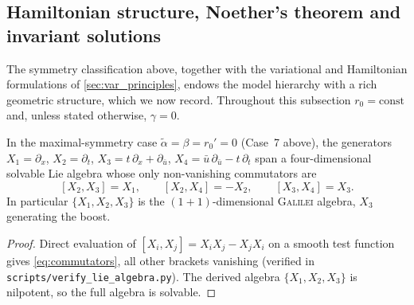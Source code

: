 \documentclass[alpha-refs, 12pt]{wiley-article}
\begin{document}
\subsection{Hamiltonian structure, Noether's theorem and invariant solutions}\label{ssec:hamiltonian}

The symmetry classification above, together with the variational and Hamiltonian formulations of \cref{sec:var_principles}, endows the model hierarchy with a rich geometric structure, which we now record. Throughout this subsection $r_{0}=\mathrm{const}$ and, unless stated otherwise, $\gamma=0$.

\begin{lemma}\label{lem:lie_algebra}
In the maximal-symmetry case $\tilde{\alpha}=\beta=r_{0}'=0$ (Case~7 above), the generators $X_{1}=\partial_{x}$, $X_{2}=\partial_{t}$, $X_{3}=t\,\partial_{x}+\partial_{\bar{u}}$, $X_{4}=\bar{u}\,\partial_{\bar{u}}-t\,\partial_{t}$ span a four-dimensional solvable Lie algebra whose only non-vanishing commutators are
\begin{equation}\label{eq:commutators}
  [X_{2},X_{3}]=X_{1},\qquad [X_{2},X_{4}]=-X_{2},\qquad [X_{3},X_{4}]=X_{3}.
\end{equation}
In particular $\{X_{1},X_{2},X_{3}\}$ is the $(1+1)$-dimensional \textsc{Galilei} algebra, $X_{3}$ generating the boost.
\end{lemma}
\begin{proof}
Direct evaluation of $[X_{i},X_{j}]=X_{i}X_{j}-X_{j}X_{i}$ on a smooth test function gives \eqref{eq:commutators}, all other brackets vanishing (verified in \texttt{scripts/verify\_lie\_algebra.py}). The derived algebra $\{X_{1},X_{2},X_{3}\}$ is nilpotent, so the full algebra is solvable.
\end{proof}
\end{document}
